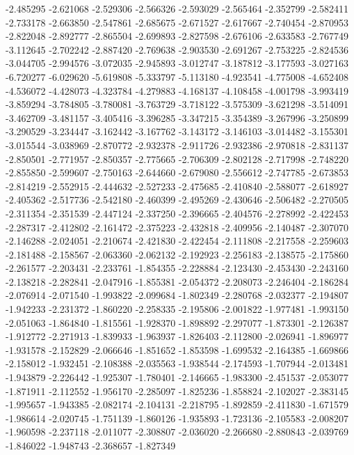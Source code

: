 -2.485295
-2.621068
-2.529306
-2.566326
-2.593029
-2.565464
-2.352799
-2.582411
-2.733178
-2.663850
-2.547861
-2.685675
-2.671527
-2.617667
-2.740454
-2.870953
-2.822048
-2.892777
-2.865504
-2.699893
-2.827598
-2.676106
-2.633583
-2.767749
-3.112645
-2.702242
-2.887420
-2.769638
-2.903530
-2.691267
-2.753225
-2.824536
-3.044705
-2.994576
-3.072035
-2.945893
-3.012747
-3.187812
-3.177593
-3.027163
-6.720277
-6.029620
-5.619808
-5.333797
-5.113180
-4.923541
-4.775008
-4.652408
-4.536072
-4.428073
-4.323784
-4.279883
-4.168137
-4.108458
-4.001798
-3.993419
-3.859294
-3.784805
-3.780081
-3.763729
-3.718122
-3.575309
-3.621298
-3.514091
-3.462709
-3.481157
-3.405416
-3.396285
-3.347215
-3.354389
-3.267996
-3.250899
-3.290529
-3.234447
-3.162442
-3.167762
-3.143172
-3.146103
-3.014482
-3.155301
-3.015544
-3.038969
-2.870772
-2.932378
-2.911726
-2.932386
-2.970818
-2.831137
-2.850501
-2.771957
-2.850357
-2.775665
-2.706309
-2.802128
-2.717998
-2.748220
-2.855850
-2.599607
-2.750163
-2.644660
-2.679080
-2.556612
-2.747785
-2.673853
-2.814219
-2.552915
-2.444632
-2.527233
-2.475685
-2.410840
-2.588077
-2.618927
-2.405362
-2.517736
-2.542180
-2.460399
-2.495269
-2.430646
-2.506482
-2.270505
-2.311354
-2.351539
-2.447124
-2.337250
-2.396665
-2.404576
-2.278992
-2.422453
-2.287317
-2.412802
-2.161472
-2.375223
-2.432818
-2.409956
-2.140487
-2.307070
-2.146288
-2.024051
-2.210674
-2.421830
-2.422454
-2.111808
-2.217558
-2.259603
-2.181488
-2.158567
-2.063360
-2.062132
-2.192923
-2.256183
-2.138575
-2.175860
-2.261577
-2.203431
-2.233761
-1.854355
-2.228884
-2.123430
-2.453430
-2.243160
-2.138218
-2.282841
-2.047916
-1.855381
-2.054372
-2.208073
-2.246404
-2.186284
-2.076914
-2.071540
-1.993822
-2.099684
-1.802349
-2.280768
-2.032377
-2.194807
-1.942233
-2.231372
-1.860220
-2.258335
-2.195806
-2.001822
-1.977481
-1.993150
-2.051063
-1.864840
-1.815561
-1.928370
-1.898892
-2.297077
-1.873301
-2.126387
-1.912772
-2.271913
-1.839933
-1.963937
-1.826403
-2.112800
-2.026941
-1.896977
-1.931578
-2.152829
-2.066646
-1.851652
-1.853598
-1.699532
-2.164385
-1.669866
-2.158012
-1.932451
-2.108388
-2.035563
-1.938544
-2.174593
-1.707944
-2.013481
-1.943879
-2.226442
-1.925307
-1.780401
-2.146665
-1.983300
-2.451537
-2.053077
-1.871911
-2.112552
-1.956170
-2.285097
-1.825236
-1.858824
-2.102027
-2.383145
-1.995657
-1.943385
-2.082174
-2.104131
-2.218795
-1.892859
-2.411830
-1.671579
-1.986614
-2.020745
-1.751139
-1.860126
-1.935893
-1.723136
-2.105583
-2.008207
-1.960598
-2.237118
-2.011077
-2.308807
-2.036020
-2.266680
-2.880843
-2.039769
-1.846022
-1.948743
-2.368657
-1.827349
